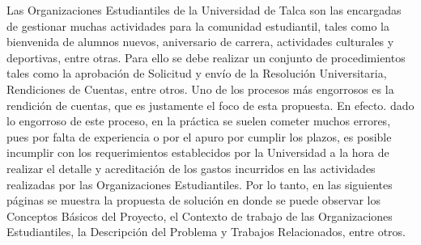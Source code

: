 Las Organizaciones Estudiantiles de la Universidad de Talca son las encargadas de gestionar muchas actividades para la comunidad estudiantil, tales como la bienvenida de alumnos nuevos, aniversario de carrera, actividades culturales y deportivas, entre otras. Para ello se debe realizar un conjunto de procedimientos tales como la aprobación de Solicitud y envío de la Resolución Universitaria, Rendiciones de Cuentas, entre otros. Uno de los procesos más engorrosos es la rendición de cuentas, que es justamente el foco de esta propuesta. En efecto. dado lo engorroso de este proceso, en la práctica se suelen cometer muchos errores, pues por falta de experiencia o por el apuro por cumplir los plazos, es posible incumplir con los requerimientos establecidos por la Universidad a la hora de realizar el detalle y acreditación de los gastos incurridos en las actividades realizadas por las Organizaciones Estudiantiles. Por lo tanto, en las siguientes páginas se muestra la propuesta de solución en donde se puede observar los Conceptos Básicos del Proyecto, el Contexto de trabajo de las Organizaciones Estudiantiles, la Descripción del Problema y Trabajos Relacionados, entre otros.